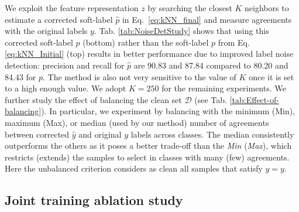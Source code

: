 \documentclass[final]{cvpr}
\begin{document}
We exploit the feature representation $z$ by searching the closest $K$ neighbors to estimate a corrected soft-label $\hat{p}$ in Eq.~\ref{eq:kNN_final} and measure agreements with the original labels $y$. Tab. \ref{tab:NoiseDetStudy} shows that using this corrected soft-label $\hat{p}$ (bottom) rather than the soft-label $p$ from Eq. \ref{eq:kNN_Initial} (top) results in better performance due to improved label noise detection: precision and  recall for $\hat{p}$ are 90.83 and 87.84 compared to 80.20 and 84.43 for ${p}$. The method is also not very sensitive to the value of $K$ once it is set to a high enough value. We adopt $K=250$ for the remaining experiments. We further study the effect of balancing the clean set $\mathcal{D}$ (see Tab. \ref{tab:Effect-of-balancing}). In particular, we experiment by balancing with the minimum (Min), maximum (Max), or median (used by our method) number of agreements between corrected $\hat{y}$ and original $y$ labels across classes. The median consistently outperforms the others as it poses a better trade-off than the \emph{Min} (\emph{Max}), which restricts (extends) the samples to select in classes with many (few) agreements. Here the unbalanced criterion considers as clean all samples that satisfy $\hat{y}=y$.

\subsection{Joint training ablation study\label{subsec:Joint-training-ablation}}
\end{document}
